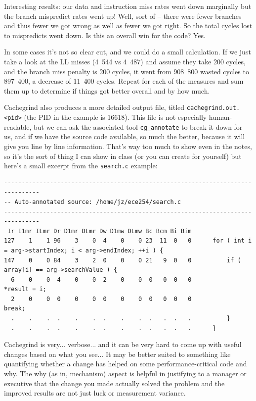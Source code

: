 Interesting results: our data and instruction miss rates went down marginally but the branch mispredict rates went up! Well, sort of -- there were fewer branches and thus fewer we got wrong as well as fewer we got right. So the total cycles lost to mispredicts went down. Is this an overall win for the code? Yes. 

In some cases it's not so clear cut, and we could do a small calculation. If we just take a look at the LL misses (4~544 vs 4~487) and assume they take 200 cycles, and the branch miss penalty is 200 cycles, it went from 908~800 wasted cycles to 897~400, a decrease of 11~400 cycles. Repeat for each of the measures and sum them up to determine if things got better overall and by how much.

Cachegrind also produces a more detailed output file, titled \texttt{cachegrind.out.<pid>} (the PID in the example is 16618). This file is not especially human-readable, but we can ask the associated tool \texttt{cg\_annotate} to break it down for us, and if we have the source code available, so much the better, because it will give you line by line information. That's way too much to show even in the notes, so it's the sort of thing I can show in class (or you can create for yourself) but here's a small excerpt from the \texttt{search.c} example:



{\scriptsize
\begin{lstlisting}
--------------------------------------------------------------------------------
-- Auto-annotated source: /home/jz/ece254/search.c
--------------------------------------------------------------------------------
 Ir I1mr ILmr Dr D1mr DLmr Dw D1mw DLmw Bc Bcm Bi Bim 
127    1    1 96    3    0  4    0    0 23  11  0   0      for ( int i = arg->startIndex; i < arg->endIndex; ++i ) {
147    0    0 84    3    2  0    0    0 21   9  0   0          if ( array[i] == arg->searchValue ) {
  6    0    0  4    0    0  2    0    0  0   0  0   0              *result = i;
  2    0    0  0    0    0  0    0    0  0   0  0   0              break;
  .    .    .  .    .    .  .    .    .  .   .  .   .          }
  .    .    .  .    .    .  .    .    .  .   .  .   .      }
\end{lstlisting}
}

Cachegrind is very... verbose... and it can be very hard to come up with useful changes based on what you see... It may be better suited to something like quantifying whether a change has helped on some performance-critical code and why. The why (as in, mechanism) aspect is helpful in justifying to a manager or executive that the change you made actually solved the problem and the improved results are not just luck or measurement variance.

